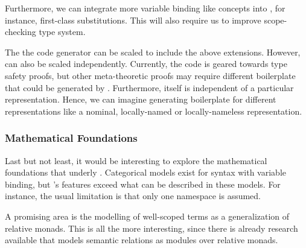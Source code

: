 Furthermore, we can integrate more variable binding like concepts into \Knot,
for instance, first-class substitutions. This will also require us to improve
\Knot scope-checking type system.

The \Needle the code generator can be scaled to include the above extensions.
However, \Needle can also be scaled independently. Currently, the code is geared
towards type safety proofs, but other meta-theoretic proofs may require
different boilerplate that could be generated by \Needle. Furthermore, \Knot
itself is independent of a particular representation. Hence, we can imagine
generating boilerplate for different representations like a nominal,
locally-named or locally-nameless representation.


\subsubsection{Mathematical Foundations}

Last but not least, it would be interesting to explore the mathematical
foundations that underly \Knot. Categorical models exist for syntax with
variable binding, but \Knot's features exceed what can be described in these
models. For instance, the usual limitation is that only one namespace is
assumed.

A promising area is the modelling of well-scoped terms as a generalization of
relative monads. This is all the more interesting, since there is already
research available that models semantic relations as modules over relative monads.


